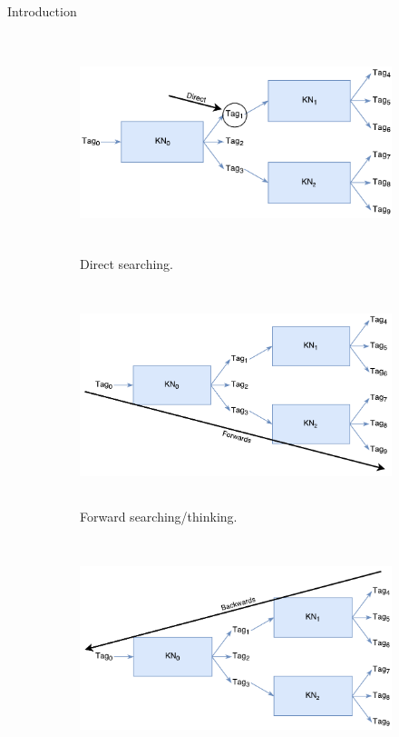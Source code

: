 \documentclass[final]{beamer} %
\begin{document}
\begin{frame}
\begin{columns}
\begin{column}{.3\textwidth}
{\begin{block}{Introduction}
					\begin{figure}[!htb]
						\centering
						\begin{subfigure}[!htb]{0.49\columnwidth}
							\centering
							\includegraphics[height=2.5in]{figures/direct_search.pdf}
							\caption{Direct searching.}
						\end{subfigure}
						\begin{subfigure}[!htb]{0.49\columnwidth}
							\centering
							\includegraphics[height=2.5in]{figures/forwards_thinking.pdf}
							\caption{Forward searching/thinking.}
							\label{think_forwards}
						\end{subfigure}
						\bigskip
						\begin{subfigure}[!htb]{0.49\columnwidth}
							\centering
							\includegraphics[height=2.5in]{figures/backwards_thinking.pdf}

\end{subfigure}
\end{figure}
\end{block}}
\end{column}
\end{columns}
\end{frame}
\end{document}
